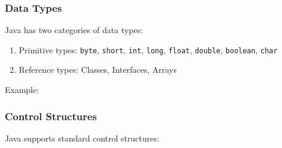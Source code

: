 \hypertarget{data-types-3}{%
\subsubsection{Data Types}\label{data-types-3}}

Java has two categories of data types:

\begin{enumerate}
\def\labelenumi{\arabic{enumi}.}
\tightlist
\item
  Primitive types: \texttt{byte}, \texttt{short}, \texttt{int},
  \texttt{long}, \texttt{float}, \texttt{double}, \texttt{boolean},
  \texttt{char}
\item
  Reference types: Classes, Interfaces, Arrays
\end{enumerate}

Example:

\begin{Shaded}
\begin{Highlighting}[]
\NormalTok{;}
\NormalTok{;}
\NormalTok{;}
\NormalTok{;}
\end{Highlighting}
\end{Shaded}

\hypertarget{control-structures-3}{%
\subsubsection{Control Structures}\label{control-structures-3}}

Java supports standard control structures:

\begin{Shaded}
\begin{Highlighting}[]
\NormalTok{;}
\NormalTok{) \{}
    \NormalTok{(}\NormalTok{);}
\NormalTok{\} }\NormalTok{ \{}
    \NormalTok{(}\NormalTok{);}
\NormalTok{\}}

\NormalTok{ (}
\NormalTok{\}}

\NormalTok{;}
\NormalTok{) \{}
\NormalTok{\}}
\end{Highlighting}
\end{Shaded}

